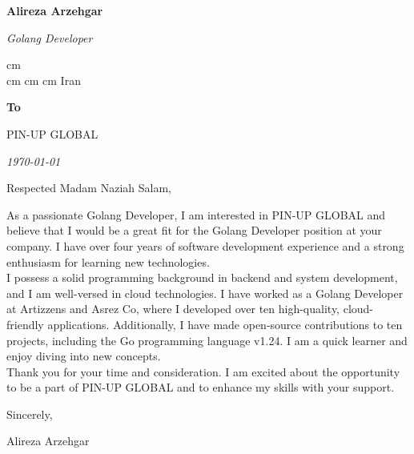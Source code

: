 \documentclass{coverletter}
\begin{document}
\textbf{\fontsize{24 pt}{24 pt}\selectfont Alireza Arzehgar}

\textit{Golang Developer}

\noindent\makebox[\linewidth]{\rule{\paperwidth}{0.1pt}}
\begin{center}
  \normalsize
  \mbox{}
   cm
  \mbox{}
  \\
   cm
  \mbox{}
   cm
  \mbox{}
   cm
  \mbox{{\color{black}\footnotesize\faMapMarker*}\hspace*{0.13cm}Iran}

  \noindent\makebox[\linewidth]{\rule{\paperwidth}{0.1pt}}
\end{center}

\vspace{2 cm}
\textbf{To}

PIN-UP GLOBAL

\textit{\today}

\vspace{1cm}
Respected Madam Naziah Salam,
\vspace{0.6 cm}
\setlength{\parindent}{20pt}

As a passionate Golang Developer, I am interested in PIN-UP GLOBAL and believe that
I would be a great fit for the Golang Developer position at your company.
I have over four years of software development experience and a strong enthusiasm for learning new technologies.
\\

I possess a solid programming background in backend and system development,
and I am well-versed in cloud technologies. I have worked as a Golang Developer at Artizzens and Asrez Co,
where I developed over ten high-quality, cloud-friendly applications.
Additionally, I have made open-source contributions to ten projects, including the Go programming language v1.24.
I am a quick learner and enjoy diving into new concepts.
\\

Thank you for your time and consideration. I am excited about the opportunity to be a part of PIN-UP GLOBAL
and to enhance my skills with your support.
\\

\vspace{0.6 cm}
\setlength{\parindent}{0pt}

Sincerely,

Alireza Arzehgar
\end{document}
